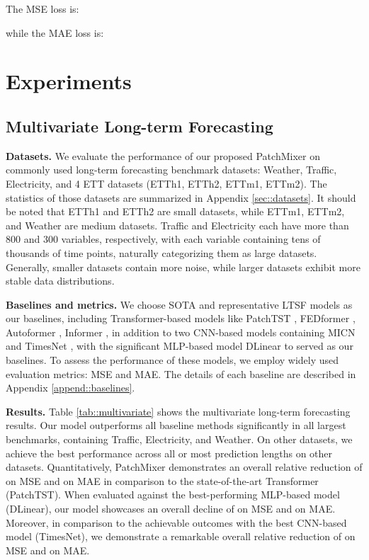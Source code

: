 \documentclass{article} \usepackage{iclr2024_conference,times}
\begin{document}
The MSE loss is: 

while the MAE loss is: 


\section{Experiments}
\subsection{Multivariate Long-term Forecasting}
\label{subsection::time series forecasting}



\textbf{Datasets.} We evaluate the performance of our proposed PatchMixer on  commonly used long-term forecasting benchmark datasets: Weather, Traffic, Electricity, and 4 ETT datasets (ETTh1, ETTh2, ETTm1, ETTm2). The statistics of those datasets are summarized in Appendix \ref{sec::datasets}. It should be noted that ETTh1 and ETTh2 are small datasets, while ETTm1, ETTm2, and Weather are medium datasets. Traffic and Electricity each have more than 800 and 300 variables, respectively, with each variable containing tens of thousands of time points, naturally categorizing them as large datasets. Generally, smaller datasets contain more noise, while larger datasets exhibit more stable data distributions.

\textbf{Baselines and metrics.} We choose SOTA and representative LTSF models as our baselines, including Transformer-based models like PatchTST \citeyearpar{patchtst}, FEDformer \citeyearpar{fedformer}, Autoformer \citeyearpar{autoformer}, Informer \citeyearpar{informer}, in addition to two CNN-based models containing MICN \citeyearpar{micn} and TimesNet \citeyearpar{timesnet}, with the significant MLP-based model DLinear \citeyearpar{dlinear} to served as our baselines. To assess the performance of these models, we employ widely used evaluation metrics: MSE and MAE. The details of each baseline are described in Appendix \ref{append::baselines}.  



\textbf{Results.} Table \ref{tab::multivariate} shows the multivariate long-term forecasting results. Our model outperforms all baseline methods significantly in all largest benchmarks, containing Traffic, Electricity, and Weather. On other datasets, we achieve the best performance across all or most prediction lengths on other datasets. Quantitatively, PatchMixer demonstrates an overall relative reduction of  on MSE and  on MAE in comparison to the state-of-the-art Transformer (PatchTST). When evaluated against the best-performing MLP-based model (DLinear), our model showcases an overall decline of  on MSE and  on MAE. Moreover, in comparison to the achievable outcomes with the best CNN-based model (TimesNet), we demonstrate a remarkable overall relative reduction of  on MSE and  on MAE.
\end{document}

